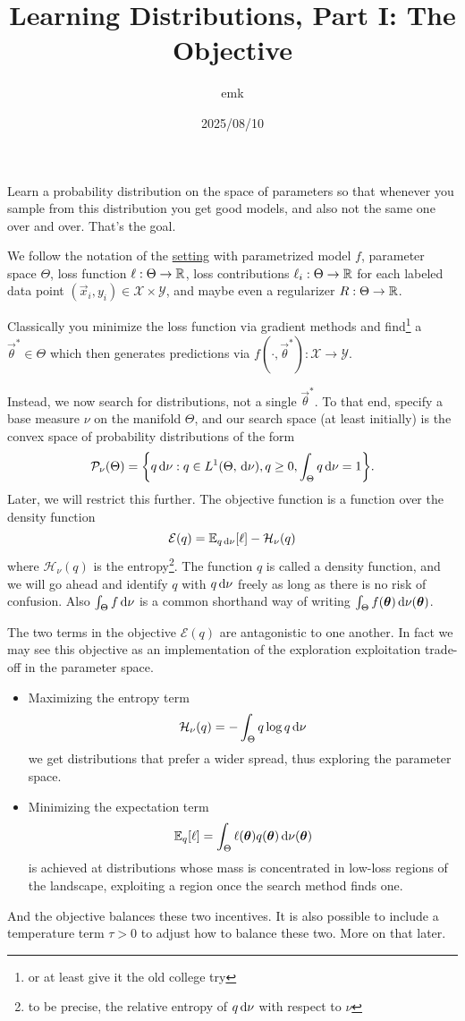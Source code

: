 \documentclass[12pt]{amsart}
\title{Learning Distributions,  Part I: The Objective}
\author{emk}
\date{2025/08/10}
\begin{document}
\maketitle

Learn a probability distribution on the space of parameters so that whenever you sample from this distribution you get good models, and also not the same one over and over. That's the goal.

We follow the notation of the \href{https://ekiral.github.io/blog/2025-06-05_notation.html}{setting} with parametrized model $f$, parameter space $\Theta$, loss function $\ell:\Theta \to \mathbb{R}$, loss contributions $\ell_i: \Theta \to \mathbb{R}$ for each labeled data point $(\vec{x}_i, y_i) \in \mathcal{X} \times \mathcal{Y}$, and maybe even a regularizer $R: \Theta \to \mathbb{R}$. 

Classically you minimize the loss function via gradient methods and find\footnote{or at least give it the old college try} a $\vec{\theta}^* \in \Theta$ which then generates predictions via $f(\cdot, \vec{\theta}^*) : \mathcal{X} \to \mathcal{Y}$.

Instead, we now search for distributions, not a single $\vec{\theta}^*$. To that end, specify a base measure $\nu$ on the manifold $\Theta$, and our search space (at least initially) is the convex space of probability distributions of the form 
\[
	\mathcal{P}_\nu(\Theta) = \bigg\{q\,\mathrm{d}\nu : q \in L^1(\Theta, \,\mathrm{d}\nu), q \geq 0, \int_\Theta q\,\mathrm{d}\nu = 1\bigg\}.
\]
Later, we will restrict this further. The objective function is a function over the density function 
\[
	\mathcal{E}(q) = \mathbb{E}_{q\,\mathrm{d}\nu}[\ell] - \mathcal{H}_\nu(q)
\]
where $\mathcal{H}_\nu(q)$ is the entropy\footnote{to be precise, the relative entropy of $q\,\mathrm{d}\nu$ with respect to $\nu$}.
The function $q$ is called a density function, and we will go ahead and identify $q$ with $q\,\mathrm{d}\nu$ freely as long as there is no risk of confusion. Also $\int_\Theta f \,\mathrm{d}\nu$ is a common shorthand way of writing $\int_{\Theta} f(\mathbf{\boldsymbol{\theta}}) \,\mathrm{d}\nu(\mathbf{\boldsymbol{\theta}})$.

The two terms in the objective $\mathcal{E}(q)$ are antagonistic to one another. In fact we may see this objective as an implementation of the exploration exploitation trade-off in the parameter space.
\begin{itemize} 
\item Maximizing the entropy term 
\[
	\mathcal{H}_\nu(q) = -\int_{\Theta} q \log q \,\mathrm{d}\nu
\]
we get distributions that prefer a wider spread, thus exploring the parameter space.
\item Minimizing the expectation term
\[
	\mathbb{E}_{q}[\ell] = \int_{\Theta} \ell(\mathbf{\boldsymbol{\theta}}) q(\mathbf{\boldsymbol{\theta}}) \,\mathrm{d}\nu(\mathbf{\boldsymbol{\theta}})
\]
is achieved at distributions whose mass is concentrated in low-loss regions of the landscape, exploiting a region once the search method finds one.
\end{itemize}
And the objective balances these two incentives. It is also possible to include a temperature term $\tau>0$ to adjust how to balance these two. More on that later.
\end{document}
